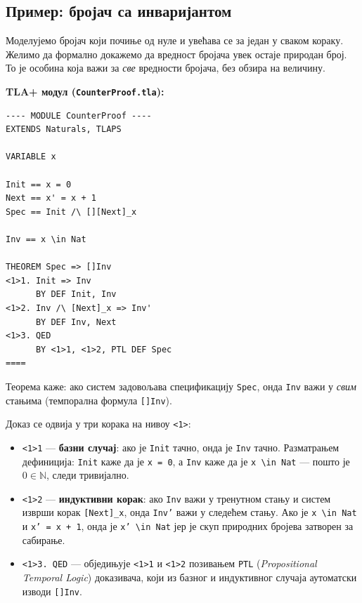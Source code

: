 \subsection{Пример: бројач са инваријантом}

Моделујемо бројач који почиње од нуле и увећава се за један у сваком кораку.
Желимо да формално докажемо да вредност бројача увек остаје природан број.
То је особина која важи за \emph{све} вредности бројача, без обзира на величину.

\begin{primer}

\textbf{TLA+ модул (\texttt{CounterProof.tla}):}
\begin{lstlisting}
---- MODULE CounterProof ----
EXTENDS Naturals, TLAPS

VARIABLE x

Init == x = 0
Next == x' = x + 1
Spec == Init /\ [][Next]_x

Inv == x \in Nat

THEOREM Spec => []Inv
<1>1. Init => Inv
      BY DEF Init, Inv
<1>2. Inv /\ [Next]_x => Inv'
      BY DEF Inv, Next
<1>3. QED
      BY <1>1, <1>2, PTL DEF Spec
====
\end{lstlisting}

Теорема каже: ако систем задовољава спецификацију \texttt{Spec}, онда \texttt{Inv} важи у
\emph{свим} стањима (темпорална формула \texttt{[]Inv}).

Доказ се одвија у три корака на нивоу \texttt{<1>}:
\begin{itemize}
    \item \texttt{<1>1} --- \textbf{базни случај}: ако је \texttt{Init} тачно, онда је \texttt{Inv} тачно.
    Разматрањем дефиниција: \texttt{Init} каже да је \texttt{x = 0}, а \texttt{Inv} каже да је \texttt{x \textbackslash in Nat} --- пошто је $0 \in \mathbb{N}$, следи тривијално.

    \item \texttt{<1>2} --- \textbf{индуктивни корак}: ако \texttt{Inv} важи у тренутном стању и
    систем изврши корак \texttt{[Next]\_x}, онда \texttt{Inv'} важи у следећем стању.
    Ако је \texttt{x \textbackslash in Nat} и \texttt{x' = x + 1}, онда је \texttt{x' \textbackslash in Nat} јер је скуп природних бројева затворен за сабирање.

    \item \texttt{<1>3. QED} --- обједињује \texttt{<1>1} и \texttt{<1>2} позивањем \texttt{PTL}
    (\textit{Propositional Temporal Logic}) доказивача, који из базног и индуктивног случаја аутоматски изводи \texttt{[]Inv}.
\end{itemize}


\end{primer}
